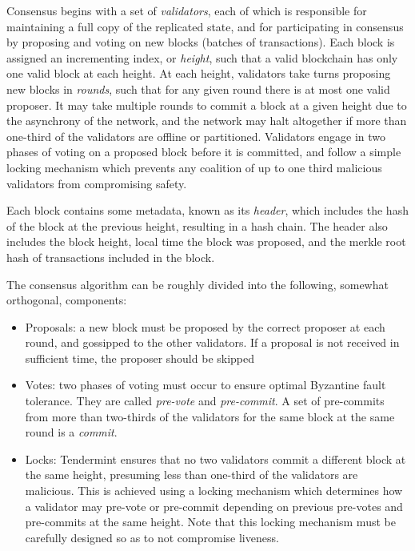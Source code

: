 Consensus begins with a set of \emph{validators}, each of which is responsible for maintaining a full copy of the replicated state,
and for participating in consensus by proposing and voting on new blocks (batches of transactions).
Each block is assigned an incrementing index, or \emph{height}, such that a valid blockchain has only one valid block at each height.
At each height, validators take turns proposing new blocks in \emph{rounds}, such that for any given round there is at most one valid proposer.
It may take multiple rounds to commit a block at a given height due to the asynchrony of the network,
and the network may halt altogether if more than one-third of the validators are offline or partitioned.
Validators engage in two phases of voting on a proposed block before it is committed, 
and follow a simple locking mechanism which prevents any coalition of up to one third malicious validators from compromising safety.

Each block contains some metadata, known as its \emph{header}, which includes the hash of the block at the previous height, resulting in a hash chain.
The header also includes the block height, local time the block was proposed, and the merkle root hash of transactions included in the block.

The consensus algorithm can be roughly divided into the following, somewhat orthogonal, components:

\begin{itemize}

\item{Proposals: a new block must be proposed by the correct proposer at each round, and gossipped to the other validators. If a proposal is not received in sufficient time, the proposer should be skipped}

\item{Votes: two phases of voting must occur to ensure optimal Byzantine fault tolerance. They are called \emph{pre-vote} and \emph{pre-commit}. A set of pre-commits from more than two-thirds of the validators for the same block at the same round is a \emph{commit}.}

\item{Locks: Tendermint ensures that no two validators commit a different block at the same height, presuming less than one-third of the validators are malicious. This is achieved using a locking mechanism which determines how a validator may pre-vote or pre-commit depending on previous pre-votes and pre-commits at the same height. Note that this locking mechanism must be carefully designed so as to not compromise liveness.}

\end{itemize}

